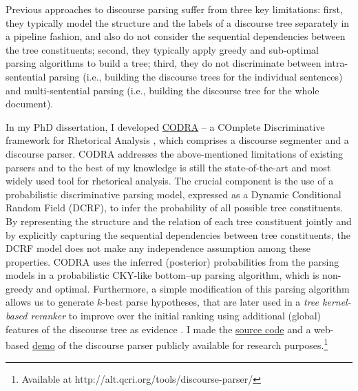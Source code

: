 \documentclass{article} %
\begin{document}
Previous approaches to discourse parsing suffer from three key limitations: first, they typically model the structure and the labels of a discourse tree separately in a pipeline fashion, and also do not consider the sequential dependencies between the tree constituents; second, they typically apply greedy and sub-optimal parsing algorithms to build a tree; third, they do not discriminate between intra-sentential parsing (i.e., building the discourse trees for the individual sentences) and multi-sentential parsing (i.e., building the discourse tree for the whole document). 

In my PhD dissertation, I developed \href{http://alt.qcri.org/tools/discourse-parser/} {CODRA} -- a COmplete Discriminative framework for Rhetorical Analysis \cite{Shafiq_codra15,Shafiq13,Shafiq12}, which comprises a discourse segmenter and a discourse parser. CODRA addresses the above-mentioned limitations of existing parsers and to the best of my knowledge is still the state-of-the-art and most widely used tool for rhetorical analysis. The crucial component is the use of a probabilistic discriminative parsing model, expressed as a Dynamic Conditional Random Field (DCRF), to infer the probability of all possible tree constituents. By representing the structure and the relation of each tree constituent jointly and by explicitly capturing the sequential dependencies between tree constituents, the DCRF model does not make any independence assumption among these properties. CODRA uses the inferred (posterior) probabilities from the parsing models in a  probabilistic CKY-like bottom--up parsing algorithm, which is non-greedy and optimal. Furthermore, a simple modification of this parsing algorithm allows us to generate $k$-best parse hypotheses, that are later used in a \emph{tree kernel-based reranker}  to improve over the initial ranking using additional (global) features of the discourse tree as evidence \cite{Shafiq_EMNLP2014}. I made the \href{http://alt.qcri.org/tools/discourse-parser/} {source code} and a web-based \href{http://alt.qcri.org/demos/Discourse_Parser_Demo/} {demo} of the discourse parser publicly available for research purposes.\footnote{Available at http://alt.qcri.org/tools/discourse-parser/} 
 




\end{document}
